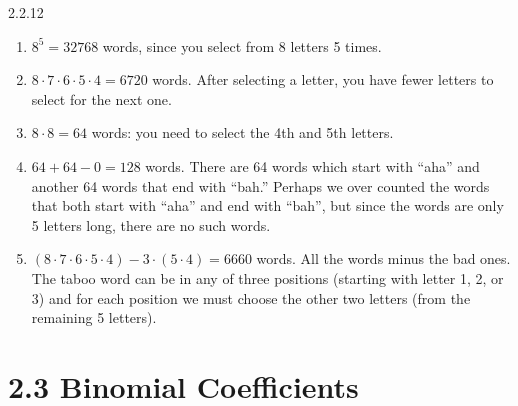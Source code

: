 \documentclass[11pt,]{book}
\theoremstyle{ptxplainnotitle}
\theoremstyle{ptxplaintitle}
\theoremstyle{ptxdefinitionnotitle}
\theoremstyle{ptxdefinitiontitle}
\theoremstyle{ptxdefinitionnotitle}
\theoremstyle{ptxdefinitiontitle}
\theoremstyle{ptxdefinitionnotitle}
\theoremstyle{ptxdefinitiontitle}
\theoremstyle{ptxdefinitiontitlenonumber}
\theoremstyle{ptxdefinitiontitlenonumber}
\numberwithin{equation}{chapter}
\begin{document}
\begin{divisionexercise}{2.2.12}
\textbf{}\hypertarget{p-1191}{}%
\leavevmode%
\begin{enumerate}[label=(\alph*)]
\item\hypertarget{li-511}{}\hypertarget{p-1192}{}%
\(8^5 = 32768\) words, since you select from 8 letters 5 times.%
\item\hypertarget{li-512}{}\hypertarget{p-1193}{}%
\(8\cdot 7\cdot 6\cdot 5\cdot 4 = 6720\) words. After selecting a letter, you have fewer letters to select for the next one.%
\item\hypertarget{li-513}{}\hypertarget{p-1194}{}%
\(8 \cdot 8 =64\) words: you need to select the 4th and 5th letters.%
\item\hypertarget{li-514}{}\hypertarget{p-1195}{}%
\(64 + 64 - 0 = 128\) words. There are 64 words which start with ``aha'' and another 64 words that end with ``bah.'' Perhaps we over counted the words that both start with ``aha'' and end with ``bah'', but since the words are only 5 letters long, there are no such words.%
\item\hypertarget{li-515}{}\hypertarget{p-1196}{}%
\((8\cdot 7\cdot 6\cdot 5\cdot 4) - 3\cdot (5\cdot 4) = 6660\) words. All the words minus the bad ones. The taboo word can be in any of three positions (starting with letter 1, 2, or 3) and for each position we must choose the other two letters (from the remaining 5 letters).%
\end{enumerate}
%
\end{divisionexercise}%
\section*{2.3 Binomial Coefficients}
\end{document}
